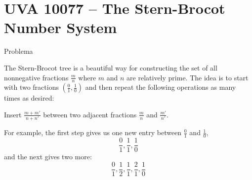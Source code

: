 \section{UVA 10077 -- The Stern-Brocot Number System}

\begin{frame}[fragile]{Problema}

The Stern-Brocot tree is a beautiful way for constructing the set of all nonnegative fractions 
$\frac{m}{n}$ where $m$ and $n$ are relatively prime. The idea is to start with two fractions 
$(\frac{0}{1}, \frac{1}{0})$ and then repeat the following operations as many times as desired:

\begin{center}
Insert $\frac{m+m'}{n+n'}$ between two adjacent fractions $\frac{m}{n}$ and $\frac{m'}{n'}$. 
\end{center}

For example, the first step gives us one new entry between $\frac{0}{1}$ and $\frac{1}{0}$,
\[
    \frac{0}{1}, \frac{1}{1}, \frac{1}{0}
\]
and the next gives two more:
\[
    \frac{0}{1}, \frac{1}{2}, \frac{1}{1}, \frac{2}{1},\frac{1}{0}
\]

\end{frame}

